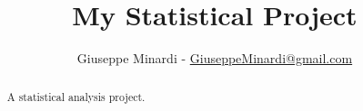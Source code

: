 \documentclass[10pt, oneside]{article}
\title{ My Statistical Project }
\author{ Giuseppe Minardi - \href{mailto:GiuseppeMinardi@gmail.com}{ GiuseppeMinardi@gmail.com } }
\begin{document}
\sloppy
\maketitle

\begin{abstract}
    A statistical analysis project.
\end{abstract}

\tableofcontents
\end{document}
